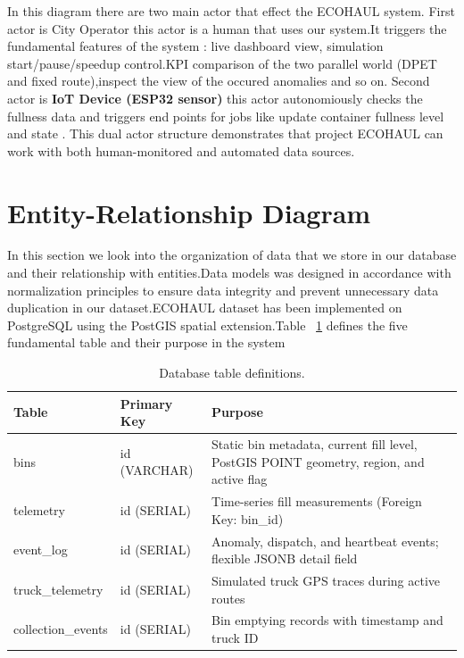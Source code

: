 \documentclass[12pt,a4paper]{report}
\begin{document}
\indent In this diagram there are two main actor that effect the ECOHAUL system. First actor is City Operator this actor is a human that uses our system.It triggers the fundamental features of the system : live dashboard view, simulation start/pause/speedup control.KPI comparison of the two parallel world (DPET and fixed route),inspect the view of the occured anomalies and so on. Second actor is \textbf{IoT Device (ESP32 sensor)} this actor autonomiously checks the fullness data  and triggers end points for jobs like update container fullness level and state . This dual actor structure demonstrates that project ECOHAUL can work with both human-monitored and automated data sources.

\section{Entity-Relationship Diagram}

\indent In this section we look into the organization of data that we store in our database and their relationship with entities.Data models  was designed in accordance with normalization principles to ensure data integrity and prevent unnecessary data duplication in our dataset.ECOHAUL dataset  has been implemented on PostgreSQL using the PostGIS spatial extension.Table ~\ref{tab:db_tables} defines the five fundamental table and their purpose in the system

\begin{table}[H]
\centering
\caption{Database table definitions.}
\label{tab:db_tables}
\begin{tabular}{llp{6.8cm}}
\toprule
\textbf{Table} & \textbf{Primary Key} & \textbf{Purpose} \\
\midrule
bins              & id (VARCHAR)  & Static bin metadata, current fill level, PostGIS POINT geometry, region, and active flag \\
telemetry         & id (SERIAL)   & Time-series fill measurements (Foreign Key: bin\_id) \\
event\_log        & id (SERIAL)   & Anomaly, dispatch, and heartbeat events; flexible JSONB detail field \\
truck\_telemetry  & id (SERIAL)   & Simulated truck GPS traces during active routes \\
collection\_events & id (SERIAL)  & Bin emptying records with timestamp and truck ID \\
\bottomrule
\end{tabular}
\end{table}
\end{document}
